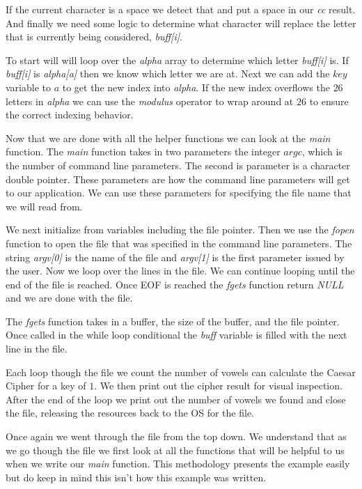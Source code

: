 If the current character is a space we detect that and put a space in our \emph{cc} result. And finally we need some logic to determine what character will replace the letter that is currently being considered, \emph{buff[i]}. 

To start will will loop over the \emph{alpha} array to determine which letter \emph{buff[i]} is. If \emph{buff[i]} is \emph{alpha[a]} then we know which letter we are at. Next we can add the $key$ variable to $a$ to get the new index into \emph{alpha}. If the new index overflows the $26$ letters in \emph{alpha} we can use the \emph{modulus} operator to wrap around at $26$ to ensure the correct indexing behavior.

Now that we are done with all the helper functions we can look at the \emph{main} function. The \emph{main} function takes in two parameters the integer $argc$, which is the number of command line parameters. The second is parameter is a character double pointer. These parameters are how the command line parameters will get to our application. We can use these parameters for specifying the file name that we will read from. 

We next initialize from variables including the file pointer. Then we use the \emph{fopen} function to open the file that was specified in the command line parameters. The string \emph{argv[0]} is the name of the file and \emph{argv[1]} is the first parameter issued by the user. Now we loop over the lines in the file. We can continue looping until the end of the file is reached. Once \ac{EOF} is reached the \emph{fgets} function return \emph{NULL} and we are done with the file. 

The \emph{fgets} function takes in a buffer, the size of the buffer, and the file pointer. Once called in the while loop conditional the \emph{buff} variable is filled with the next line in the file. 

Each loop though the file we count the number of vowels can calculate the Caesar Cipher for a key of $1$. We then print out the cipher result for visual inspection. After the end of the loop we print out the number of vowels we found and close the file, releasing the resources back to the \ac{OS} for the file. 



Once again we went through the file from the top down. We understand that as we go though the file we first look at all the functions that will be helpful to us when we write our \emph{main} function. This methodology presents the example easily but do keep in mind this isn't how this example was written. 

